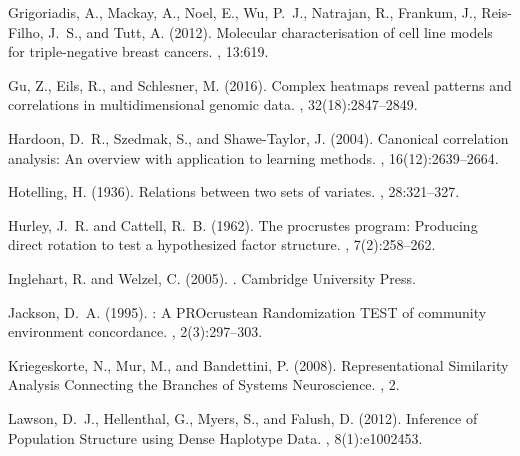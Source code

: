 \documentclass[a4]{article}
\newcommand{\+}[1]{\mathbf{#1}}
\begin{document}
\begin{thebibliography}{}
Grigoriadis, A., Mackay, A., Noel, E., Wu, P.~J., Natrajan, R., Frankum, J.,
  {Reis-Filho}, J.~S., and Tutt, A. (2012).
\newblock Molecular characterisation of cell line models for triple-negative
  breast cancers.
, 13:619.

Gu, Z., Eils, R., and Schlesner, M. (2016).
\newblock Complex heatmaps reveal patterns and correlations in multidimensional
  genomic data.
, 32(18):2847--2849.

Hardoon, D.~R., Szedmak, S., and Shawe-Taylor, J. (2004).
\newblock Canonical correlation analysis: An overview with application to
  learning methods.
, 16(12):2639--2664.

Hotelling, H. (1936).
\newblock Relations between two sets of variates.
, 28:321--327.

Hurley, J.~R. and Cattell, R.~B. (1962).
\newblock The procrustes program: {{Producing}} direct rotation to test a
  hypothesized factor structure.
, 7(2):258--262.

Inglehart, R. and Welzel, C. (2005).
.
\newblock Cambridge University Press.

Jackson, D.~A. (1995).
: {{A PROcrustean Randomization TEST}} of community
  environment concordance.
, 2(3):297--303.

Kriegeskorte, N., Mur, M., and Bandettini, P. (2008).
\newblock Representational {{Similarity Analysis}} \textendash{} {{Connecting}}
  the {{Branches}} of {{Systems Neuroscience}}.
, 2.

Lawson, D.~J., Hellenthal, G., Myers, S., and Falush, D. (2012).
\newblock Inference of {{Population Structure}} using {{Dense Haplotype Data}}.
, 8(1):e1002453.


\end{thebibliography}
\end{document}
